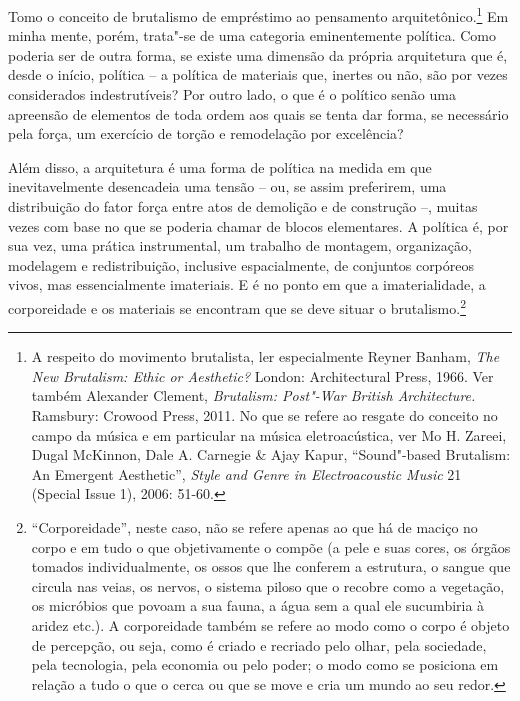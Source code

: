 \pagebreak

\vspace*{1.5cm}


\bigskip

\hfill{}

\bigskip
\bigskip
\bigskip

\begin{multicols}{2}
\noindent{}Tomo o conceito de brutalismo de empréstimo ao pensamento
arquitetônico.\footnote{A respeito do movimento brutalista, ler
  especialmente Reyner Banham, \textit{The New Brutalism: Ethic or
  Aesthetic?} London: Architectural Press, 1966. Ver também Alexander
  Clement, \textit{Brutalism: Post"-War British Architecture.} Ramsbury:
  Crowood Press, 2011. No que se refere ao resgate do conceito no campo
  da música e em particular na música eletroacústica, ver Mo H. Zareei,
  Dugal McKinnon, Dale A. Carnegie \& Ajay Kapur, ``Sound"-based
  Brutalism: An Emergent Aesthetic'', \textit{Style and Genre in
  Electroacoustic Music} 21 (Special Issue 1), 2006: 51-60.} Em minha
mente, porém, trata"-se de uma categoria eminentemente política. Como
poderia ser de outra forma, se existe uma dimensão da própria
arquitetura que é, desde o início, política -- a política de materiais
que, inertes ou não, são por vezes considerados indestrutíveis? Por
outro lado, o que é o político senão uma apreensão de elementos de toda
ordem aos quais se tenta dar forma, se necessário pela força, um
exercício de torção e remodelação por excelência?

Além disso, a arquitetura é uma forma de política na medida em que
inevitavelmente desencadeia uma tensão -- ou, se assim preferirem, uma
distribuição do fator força entre atos de demolição e de construção --,
muitas vezes com base no que se poderia chamar de blocos elementares. A
política é, por sua vez, uma prática instrumental, um trabalho de
montagem, organização, modelagem e redistribuição, inclusive
espacialmente, de conjuntos corpóreos vivos, mas essencialmente
imateriais. E é no ponto em que a imaterialidade, a corporeidade e os
materiais se encontram que se deve situar o brutalismo.\footnote{``Corporeidade'',
  neste caso, não se refere apenas ao que há de maciço no corpo e em
  tudo o que objetivamente o compõe (a pele e suas cores, os órgãos
  tomados individualmente, os ossos que lhe conferem a estrutura, o
  sangue que circula nas veias, os nervos, o sistema piloso que o
  recobre como a vegetação, os micróbios que povoam a sua fauna, a água
  sem a qual ele sucumbiria à aridez etc.). A corporeidade também se
  refere ao modo como o corpo é objeto de percepção, ou seja, como é
  criado e recriado pelo olhar, pela sociedade, pela tecnologia, pela
  economia ou pelo poder; o modo como se posiciona em relação a tudo o
  que o cerca ou que se move e cria um mundo ao seu redor.}


\end{multicols}
